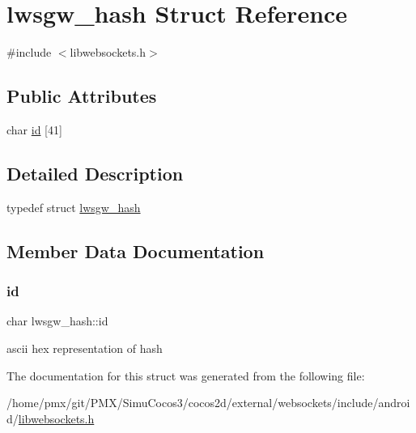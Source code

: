 \hypertarget{structlwsgw__hash}{}\section{lwsgw\+\_\+hash Struct Reference}
\label{structlwsgw__hash}


{\ttfamily \#include $<$libwebsockets.\+h$>$}

\subsection*{Public Attributes}
\begin{DoxyCompactItemize}
\item 
char \hyperlink{structlwsgw__hash_a5f0db550b0a00eb03119ca3d16d0eadf}{id} \mbox{[}41\mbox{]}
\end{DoxyCompactItemize}


\subsection{Detailed Description}
typedef struct \hyperlink{structlwsgw__hash}{lwsgw\+\_\+hash} 

\subsection{Member Data Documentation}
\mbox{\label{structlwsgw__hash_a5f0db550b0a00eb03119ca3d16d0eadf}} 
\subsubsection{\texorpdfstring{id}{id}}
{\footnotesize\ttfamily char lwsgw\+\_\+hash\+::id}

ascii hex representation of hash 

The documentation for this struct was generated from the following file\+:\begin{DoxyCompactItemize}
\item 
/home/pmx/git/\+P\+M\+X/\+Simu\+Cocos3/cocos2d/external/websockets/include/android/\hyperlink{_2cocos2d_2external_2websockets_2include_2android_2libwebsockets_8h}{libwebsockets.\+h}\end{DoxyCompactItemize}
